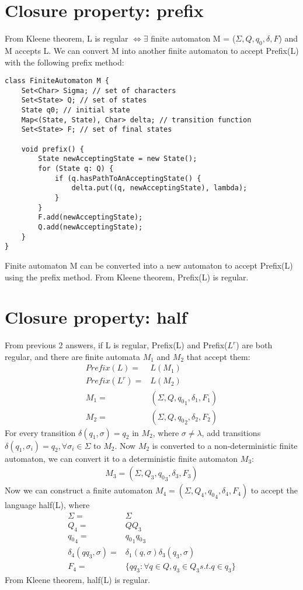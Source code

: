 \documentclass{article}
\begin{document}
\section{Closure property: prefix}
From Kleene theorem, L is regular $\iff \exists$ finite automaton M =
($\Sigma, Q, q_0, \delta, F$) and M accepts L. We can convert M into another
finite automaton to accept Prefix(L) with the following prefix method:
\begin{lstlisting}
class FiniteAutomaton M {
	Set<Char> Sigma; // set of characters
	Set<State> Q; // set of states
	State q0; // initial state
	Map<(State, State), Char> delta; // transition function
	Set<State> F; // set of final states

	void prefix() {
		State newAcceptingState = new State();
		for (State q: Q) {
			if (q.hasPathToAnAcceptingState() {
				delta.put((q, newAcceptingState), lambda);
			}
		}
		F.add(newAcceptingState);
		Q.add(newAcceptingState);
	}
}
\end{lstlisting}
Finite automaton M can be converted into a new automaton to accept Prefix(L)
using the prefix method. From Kleene theorem, Prefix(L) is regular.
\section{Closure property: half}
From previous 2 answers, if L is regular, Prefix(L) and Prefix($L^r$) are
both regular, and there are finite automata $M_1$ and $M_2$ that accept them:
\begin{align*}
Prefix(L) =& L(M_1)\\
Prefix(L^r) =& L(M_2)\\
M_1 =& (\Sigma, Q, {q_0}_1, \delta_1, F_1)\\
M_2 =& (\Sigma, Q, {q_0}_2, \delta_2, F_2)
\end{align*}
For every transition $\delta(q_1, \sigma) = q_2$ in $M_2$, where
$\sigma \neq \lambda$, add transitions $\delta(q_1, \sigma_i) = q_2, \forall
\sigma_i \in \Sigma$ to $M_2$. Now $M_2$ is converted to a non-deterministic
finite automaton, we can convert it to a deterministic finite automaton $M_3$:
\begin{align*}
M_3 = (\Sigma, Q_3, {q_0}_3, \delta_3, F_3)
\end{align*}
Now we can construct a finite automaton $M_4 = (\Sigma,
Q_4, {q_0}_4, \delta_4, F_4)$ to accept the language half(L), where
\begin{align*}
\Sigma =& \Sigma\\
Q_4 =& QQ_3\\
{q_0}_4 =& {q_0}_1{q_0}_3\\
\delta_4(qq_3, \sigma) =& \delta_1(q, \sigma)\delta_3(q_3, \sigma)\\
F_4 =& \{qq_3 : \forall q \in Q, q_3 \in Q_3 s.t. q \in q_3 \}
\end{align*}
From Kleene theorem, half(L) is regular.
\end{document}
